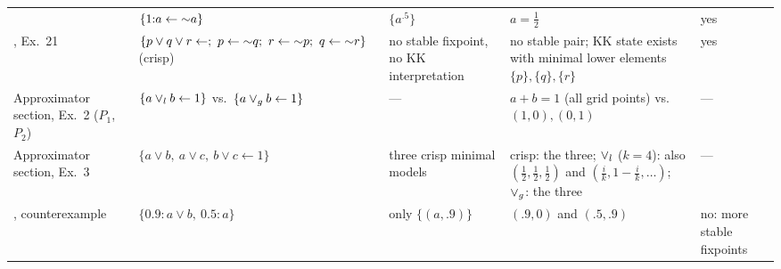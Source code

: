 {\begin{longtable}{@{}p{}p{}p{}p{}p{}@{}}
            \cite{BautersSDV14tplp}                              & $\{1{:}a\leftarrow\mathord{\sim}  a\}$                                                                                                                                   & $\{a^{.5}\}$                                                          & $a=\frac12$                                                                                                                     & yes                       \\
            \cite{HeyninckAB22arxiv}, Ex.~21                     & $\{p\lor q\lor r\leftarrow;\ p\leftarrow\flpnot  q;\ r\leftarrow\flpnot  p;\ q\leftarrow\flpnot  r\}$ (crisp)                                                     & no stable fixpoint, no KK interpretation                              & no stable pair; KK state exists with minimal lower elements $\{p\},\{q\},\{r\}$                                                 & yes                       \\
            Approximator section, Ex.~2 ($P_1$, $P_2$)           & $\{a\lor_l b\leftarrow1\}$ vs.\ $\{a\lor_g b\leftarrow1\}$                                                                                                    & ---                                                                   & $a+b=1$ (all grid points) vs.\ $(1,0),(0,1)$                                                                                    & ---                       \\
            Approximator section, Ex.~3                          & $\{a\lor b,\ a\lor c,\ b\lor c\leftarrow1\}$                                                                                                                      & three crisp minimal models                                            & crisp: the three; $\lor_l$ ($k=4$): also $(\frac12,\frac12,\frac12)$ and $(\frac ik,1-\frac ik,\dots)$; $\lor_g$: the three & ---                       \\
            \cite{NievesOC13}, counterexample                    & $\{0.9{:}a\lor b,\ 0.5{:}a\}$                                                                                                                                     & only $\{(a,.9)\}$                                                     & $(.9,0)$ and $(.5,.9)$                                                                                                          & no: more stable fixpoints \\
        \end{longtable}

}
